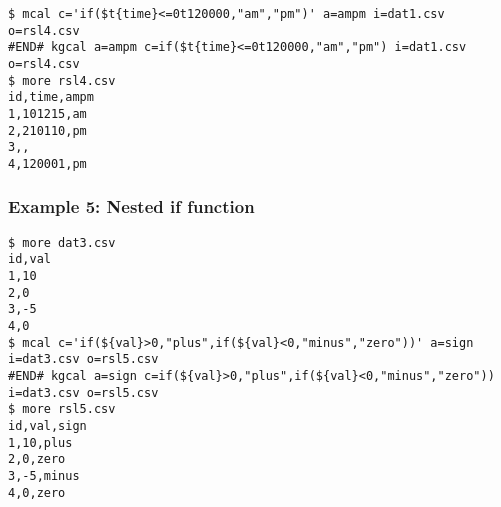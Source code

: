 \begin{Verbatim}[baselinestretch=0.7,frame=single]
$ mcal c='if($t{time}<=0t120000,"am","pm")' a=ampm i=dat1.csv o=rsl4.csv
#END# kgcal a=ampm c=if($t{time}<=0t120000,"am","pm") i=dat1.csv o=rsl4.csv
$ more rsl4.csv
id,time,ampm
1,101215,am
2,210110,pm
3,,
4,120001,pm
\end{Verbatim}
\subsubsection*{Example 5: Nested if function}



\begin{Verbatim}[baselinestretch=0.7,frame=single]
$ more dat3.csv
id,val
1,10
2,0
3,-5
4,0
$ mcal c='if(${val}>0,"plus",if(${val}<0,"minus","zero"))' a=sign i=dat3.csv o=rsl5.csv
#END# kgcal a=sign c=if(${val}>0,"plus",if(${val}<0,"minus","zero")) i=dat3.csv o=rsl5.csv
$ more rsl5.csv
id,val,sign
1,10,plus
2,0,zero
3,-5,minus
4,0,zero
\end{Verbatim}
